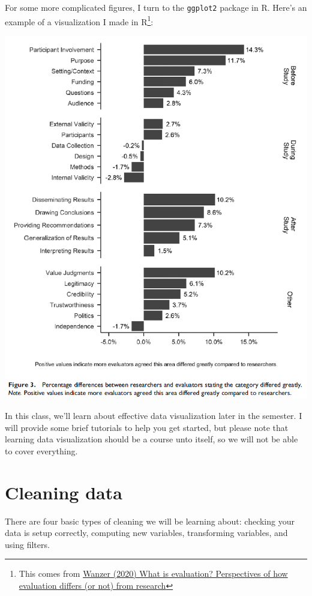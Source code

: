 \documentclass[
]{book}
\begin{document}
For some more complicated figures, I turn to the \texttt{ggplot2} package in R. Here's an example of a visualization I made in R\footnote{This comes from \href{https://journals.sagepub.com/doi/10.1177/1098214020920710}{Wanzer (2020) What is evaluation? Perspectives of how evaluation differs (or not) from research}}:

\includegraphics{images/02-stats-foundations/example4.png}

In this class, we'll learn about effective data visualization later in the semester. I will provide some brief tutorials to help you get started, but please note that learning data visualization should be a course unto itself, so we will not be able to cover everything.

\hypertarget{cleaning-data}{%
\section{Cleaning data}\label{cleaning-data}}

There are four basic types of cleaning we will be learning about: checking your data is setup correctly, computing new variables, transforming variables, and using filters.
\end{document}
